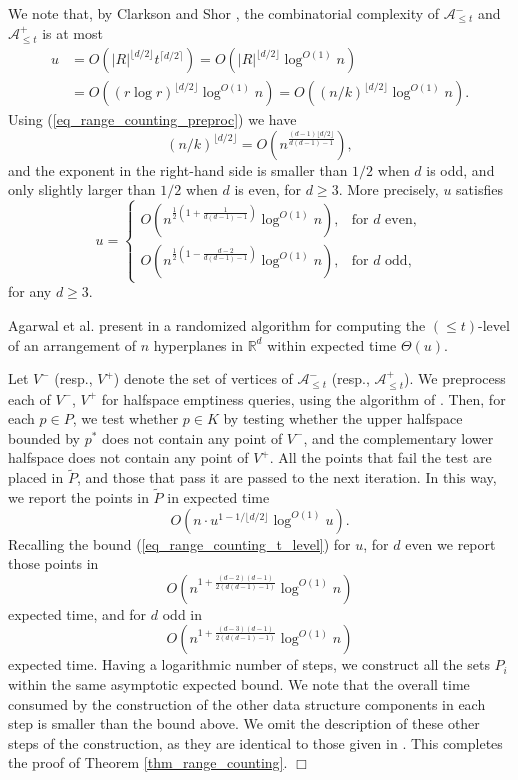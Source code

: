 \documentclass[11pt]{article}
\def\reals{\mathbb R}
\begin{document}
We note that, by Clarkson and Shor \cite{cs89}, the combinatorial complexity of $\mathcal{A}^{-}_{\leq t}$ and $\mathcal{A}^{+}_{\leq t}$ is at most
\begin{align*}
u &= O\left(|R|^{\lfloor d/2 \rfloor} t^{\lceil d/2 \rceil} \right) = O\left(|R|^{\lfloor d/2 \rfloor} \log^{O(1)}n \right) \\
&= O\left((r\log r)^{\lfloor d/2 \rfloor} \log^{O(1)}n \right) = O\left((n/k)^{\lfloor d/2 \rfloor} \log^{O(1)}n \right).
\end{align*}
Using (\ref{eq_range_counting_preproc}) we have
$$
(n/k)^{\lfloor d/2 \rfloor} = O\left(n^{\frac{(d-1)\lfloor d/2 \rfloor}{d(d-1)-1}}\right),
$$
and the exponent in the right-hand side is smaller than $1/2$ when $d$ is odd, and only slightly larger than $1/2$ when $d$ is even, for $d \geq 3$. More precisely, $u$ satisfies
\begin{equation} \label{eq_range_counting_t_level}
u =
\begin{cases}
    O\left(n^{\frac{1}{2}\left(1 + \frac{1}{d(d-1)-1}\right)} \log^{O(1)}n \right), & \mbox{for $d$ even}, \\
    O\left(n^{\frac{1}{2}\left(1 - \frac{d-2}{d(d-1)-1}\right)} \log^{O(1)}n \right), & \mbox{for $d$ odd},
\end{cases}
\end{equation}
for any $d \geq 3$.

Agarwal et al. present in \cite{adbms98} a randomized algorithm for computing the $(\leq t)$-level of an arrangement of $n$ hyperplanes in $\reals^{d}$ within expected time $\Theta(u)$.

Let $V^{-}$ (resp., $V^{+}$) denote the set of vertices of $\mathcal{A}^{-}_{\leq t}$ (resp., $\mathcal{A}^{+}_{\leq t}$). We preprocess each of $V^{-}$, $V^{+}$ for halfspace emptiness queries, using the algorithm of \cite{mat92b}. Then, for each $p \in P$, we test whether $p \in K$ by testing whether the upper halfspace bounded by $p^{*}$ does not contain any point of $V^{-}$, and the complementary lower halfspace does not contain any point of $V^{+}$. All the points that fail the test are placed in $\tilde{P}$, and those that pass it are passed to the next iteration. In this way, we report the points in $\tilde{P}$ in expected time
$$
O\left(n \cdot u^{1-1/\lfloor d/2 \rfloor} \log^{O(1)}u \right).
$$
Recalling the bound (\ref{eq_range_counting_t_level}) for $u$, for $d$ even we report those points in
$$
O\left(n^{1 + \frac{(d-2)(d-1)}{2(d(d-1)-1)}} \log^{O(1)}n \right)
$$
expected time, and for $d$ odd in
$$
O\left(n^{1 + \frac{(d-3)(d-1)}{2(d(d-1)-1)}} \log^{O(1)}n \right)
$$
expected time. Having a logarithmic number of steps, we construct all the sets $P_{i}$ within the same asymptotic expected bound. We note that the overall time consumed by the construction of the other data structure components in each step is smaller than the bound above. We omit the description of these other steps of the construction, as they are identical to those given in \cite{mat92a, mat92b}. This completes the proof of Theorem \ref{thm_range_counting}. $\Box$
\end{document}
